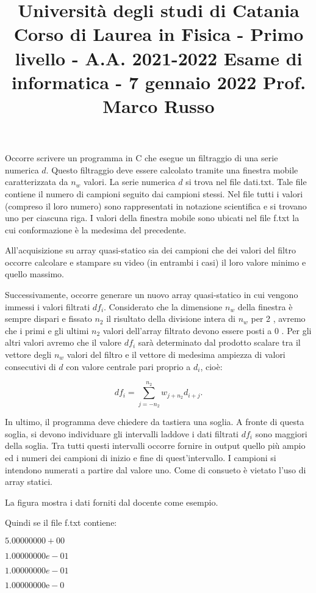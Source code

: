 \documentclass[10pt]{article}
\title{Università degli studi di Catania 
 Corso di Laurea in Fisica - Primo livello - A.A. 2021-2022 
 Esame di informatica - 7 gennaio 2022 
 Prof. Marco Russo }
\author{}
\date{}
\begin{document}
\maketitle
Occorre scrivere un programma in \(\mathrm{C}\) che esegue un filtraggio di una serie numerica \(d\). Questo filtraggio deve essere calcolato tramite una finestra mobile caratterizzata da \(n_{w}\) valori. La serie numerica \(d\) si trova nel file dati.txt. Tale file contiene il numero di campioni seguito dai campioni stessi. Nel file tutti i valori (compreso il loro numero) sono rappresentati in notazione scientifica e si trovano uno per ciascuna riga. I valori della finestra mobile sono ubicati nel file f.txt la cui conformazione è la medesima del precedente.

All'acquisizione su array quasi-statico sia dei campioni che dei valori del filtro occorre calcolare e stampare su video (in entrambi i casi) il loro valore minimo e quello massimo.

Successivamente, occorre generare un nuovo array quasi-statico in cui vengono immessi i valori filtrati \(d f_{i}\). Considerato che la dimensione \(n_{w}\) della finestra è sempre dispari e fissato \(n_{2}\) il risultato della divisione intera di \(n_{w}\) per 2 , avremo che i primi e gli ultimi \(n_{2}\) valori dell'array filtrato devono essere posti a 0 . Per gli altri valori avremo che il valore \(d f_{i}\) sarà determinato dal prodotto scalare tra il vettore degli \(n_{w}\) valori del filtro e il vettore di medesima ampiezza di valori consecutivi di \(d\) con valore centrale pari proprio a \(d_{i}\), cioè:

\[
d f_{i}=\sum_{j=-n_{2}}^{n_{2}} w_{j+n_{2}} d_{i+j} .
\]

In ultimo, il programma deve chiedere da tastiera una soglia. A fronte di questa soglia, si devono individuare gli intervalli laddove i dati filtrati \(d f_{i}\) sono maggiori della soglia. Tra tutti questi intervalli occorre fornire in output quello più ampio ed i numeri dei campioni di inizio e fine di quest'intervallo. I campioni si intendono numerati a partire dal valore uno. Come di consueto è vietato l'uso di array statici.

La figura mostra i dati forniti dal docente come esempio.

Quindi se il file f.txt contiene:

\(5.00000000+00\)

\(1.00000000 e-01\)

\(1.00000000 e-01\)

\(1.00000000 \mathrm{e}-0\)
\end{document}
